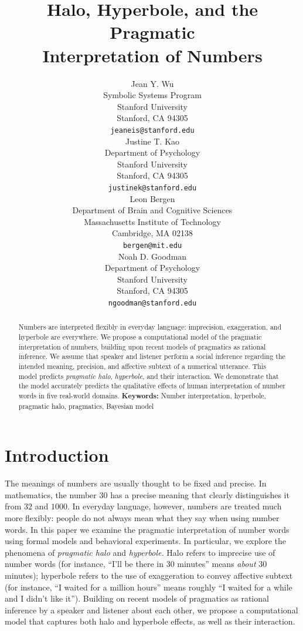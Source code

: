 \documentclass{article} %
\title{Halo, Hyperbole, and the Pragmatic \\ Interpretation of Numbers}
\author{
Jean Y. Wu \\
Symbolic Systems Program\\
Stanford University\\
Stanford, CA 94305 \\
\texttt{jeaneis@stanford.edu} \\
\And
Justine T. Kao \\
Department of Psychology\\
Stanford University \\
Stanford, CA 94305 \\
\texttt{justinek@stanford.edu} \\
\AND
Leon Bergen \\
Department of Brain and Cognitive Sciences\\
Massachusetts Institute of Technology \\
Cambridge, MA 02138\\
\texttt{bergen@mit.edu} \\
\And
Noah D. Goodman \\
Department of Psychology\\
Stanford University \\ 
Stanford, CA 94305\\
\texttt{ngoodman@stanford.edu} \\
}
\begin{document}
\maketitle

\begin{abstract}
Numbers are interpreted flexibly in everyday language: imprecision, exaggeration, and hyperbole are everywhere. We propose a computational model of the pragmatic interpretation of numbers, building upon recent models of pragmatics as rational inference. We assume that speaker and listener perform a social inference regarding the intended meaning, precision, and affective subtext of a numerical utterance. This model predicts \emph{pragmatic halo}, \emph{hyperbole}, and their interaction. We demonstrate that the model accurately predicts the qualitative effects of human interpretation of number words in five real-world domains.
\textbf{Keywords:} 
Number interpretation, hyperbole, pragmatic halo, pragmatics, Bayesian model
\end{abstract}


\section{Introduction}

The meanings of numbers are usually thought to be fixed and precise. In mathematics, the number $30$ has a precise meaning that clearly distinguishes it from $32$ and $1000$. In everyday language, however, numbers are treated much more flexibly: people do not always mean what they say when using number words. In this paper we examine the pragmatic interpretation of number words using formal models and behavioral experiments.
In particular, we explore the phenomena of \emph{pragmatic halo} and \emph{hyperbole.} Halo refers to imprecise use of number words (for instance, ``I'll be there in 30 minutes'' means \emph{about} 30 minutes); hyperbole refers to the use of exaggeration to convey affective subtext (for instance, ``I waited for a million hours'' means roughly ``I waited for a while and I didn't like it'').
Building on recent models of pragmatics as rational inference by a speaker and listener about each other, we propose a computational model that captures both halo and hyperbole effects, as well as their interaction.
\end{document}

